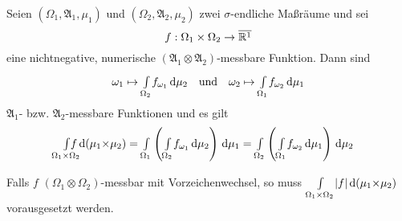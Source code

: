 \documentclass{cheat-sheet}
\newcommand{\Alg}{\mathfrak{A}} %
\renewcommand{\P}{\mathbb{P}} %
\newcommand{\E}{\mathbb{E}} %
\newcommand{\Leb}{\mathcal{L}} %
\renewcommand{\ER}{\overline{\R^1}} %
\begin{document}
\begin{satz}
  Seien $(\Omega_1, \Alg_1, \mu_1)$ und $(\Omega_2, \Alg_2, \mu_2)$ zwei $\sigma$-endliche Maßräume und sei
  \[ f : \Omega_1 \times \Omega_2 \to \ER \]
  eine nichtnegative, numerische $(\Alg_1 {\otimes} \Alg_2)$-messbare Funktion. Dann sind
  \begin{align*}
    \omega_1 \mapsto {\textstyle \int\limits_{\Omega_2}^{}} f_{\omega_1} \,\mathrm{d} \mu_2
    \quad \text{und} \quad
    \omega_2 \mapsto {\textstyle \int\limits_{\Omega_1}^{}} f_{\omega_2} \,\mathrm{d} \mu_1
  \end{align*}
  $\Alg_1$- bzw. $\Alg_2$-messbare Funktionen und es gilt
  \[
    \Int{\mathclap{\Omega_1 \times \Omega_2}}{}{f}{(\mu_1 {\times} \mu_2)} =
    \Int{\Omega_1}{}{\left( \Int{\Omega_2}{}{f_{\omega_1}}{\mu_2} \right)}{\mu_1} = 
    \Int{\Omega_2}{}{\left( \Int{\Omega_1}{}{f_{\omega_2}}{\mu_1} \right)}{\mu_2}
  \]
\end{satz}

\begin{bem}
  Falls $f$ $(\Omega_1 {\otimes} \Omega_2)$-messbar mit Vorzeichenwechsel, so muss ${\textstyle \int\limits_{\Omega_1 {\times} \Omega_2}^{}} \lvert f\rvert \,\mathrm{d} (\mu_1 {\times} \mu_2)$ vorausgesetzt werden.
\end{bem}


\iffalse
  $\Omega_1 = \Omega_2 = \cinterval{0}{1}$, $\mu_1 = \mu_2 = \lambda_1$
  \begin{itemize}
    \item $f(x, y) \coloneqq \tfrac{x^2 - y^2}{(x^2 + y^2)^2}$
    \item $f(x, y) \coloneqq \begin{cases} (x - \tfrac{1}{2})^{-3} & \text{für } 0 < y < \abs{x - \tfrac{1}{2}} \\ 0, & \text{sonst}$
    \item $f(x, y) \coloneqq \tfrac{x-y}{(x^2 + y^2)^\tfrac{3}{2}}$
    \item $f(x, y) \coloneqq \tfrac{1}{(1-xy)^p}$ mit $p > 0$
  \end{itemize}

  Beispiel: Gaußsches weißes Rauschen

  Sei $T = \cinterval{0}{1}$, $(X_t)_{t \in T}$ eine Familie unabhängiger, $N(0, 1)$-vertielter ZGn über eiem W-Raum $(\Omega, \Alg, \P)$.

  Produktraum: $(T \times \Omega, \Leb(T) \otimes \Alg, \lambda_1 \times \P)$

  Problem: $\Int{T}{}{\Int{T}{}{\E X_s X_t}{s}}{t} = \lambda_2(\Set{ (s, s) }{ s \in T }) = 0$
\fi
\end{document}
